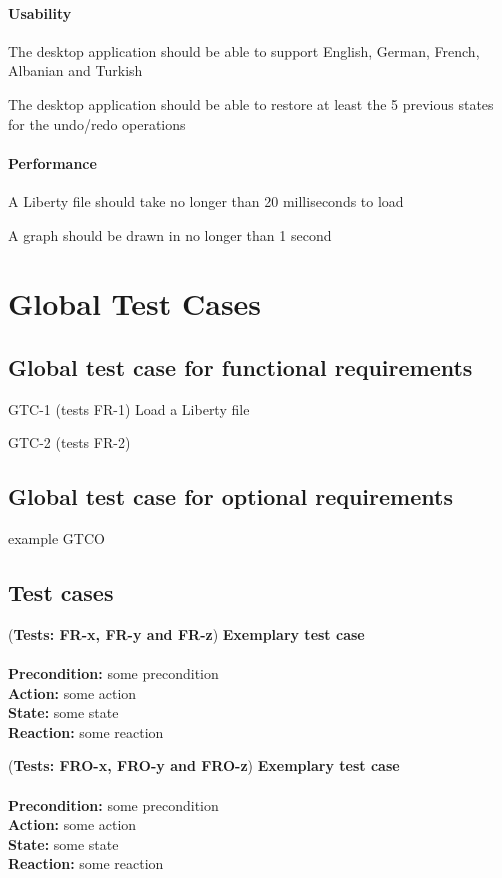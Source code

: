 \documentclass[10pt,a4paper]{report}
\newcommand{\precondition}[1]{
    \textbf{Precondition: } #1 \leavevmode \\
}
\newcommand{\action}[1]{
    \textbf{Action: } #1 \leavevmode \\
}
\newcommand{\state}[1]{
    \textbf{State: } #1 \leavevmode \\
}
\newcommand{\reaction}[1]{
    \textbf{Reaction: } #1 \leavevmode \\
}
\newcommand{\GTCDescription}[2]{
    (\textbf{Tests: #1}) \textbf{#2} \leavevmode \\
}
\newcommand{\GTCODescription}[2]{
    (\textbf{Tests: #1}) \textbf{#2} \leavevmode \\
}
\begin{document}
\subsubsection{Usability}
\begin{NFRO-Usability}
    \item The desktop application should be able to support English, German, French, Albanian and Turkish
    \item The desktop application should be able to restore at least the 5 previous states for the undo/redo operations 
\end{NFRO-Usability}

\subsubsection{Performance}
\begin{NFRO-Perf}
    \item A Liberty file should take no longer than 20 milliseconds to load
    \item A graph should be drawn in no longer than 1 second
\end{NFRO-Perf}

\chapter{Global Test Cases}

\section{Global test case for functional requirements}
\begin{GTC}
    \item GTC-1 (tests FR-1) Load a Liberty file
    \item GTC-2 (tests FR-2) 
\end{GTC}

\section{Global test case for optional requirements}
\begin{GTCO}
    \item example GTCO
\end{GTCO}

\section{Test cases}
\begin{GTC}
    \item \GTCDescription{FR-x, FR-y and FR-z}{Exemplary test case} \leavevmode \\ \precondition{some precondition}\action{some action}\state{some state}\reaction{some reaction}
\end{GTC}
\begin{GTCO}
    \item \GTCODescription{FRO-x, FRO-y and FRO-z}{Exemplary test case} \leavevmode \\ \precondition{some precondition}\action{some action}\state{some state}\reaction{some reaction}
\end{GTCO}
\end{document}
